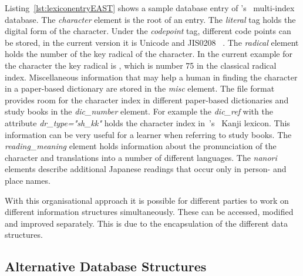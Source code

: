 Listing~\ref{lst:lexiconentryEAST} shows a sample database entry of 
's~\citeyear{Breen2004} 
multi-index database.
The \emph{character} element is the root of an entry. The \emph{literal} tag 
holds the digital form of the character. Under the \emph{codepoint} tag, 
different code points can be stored, in the current version it is Unicode and 
JIS0208 ~. 
The \emph{radical} element holds the number of the key radical of the character.
In the current example for the character  the key radical is ,
which is number 75 in the classical radical index.
Miscellaneous information that may help a human in finding the character in a 
paper-based dictionary are stored in the \emph{misc} element.
The file format provides room for the character index in different paper-based
dictionaries and study books in the \emph{dic\_number} element. For example 
the \emph{dic\_ref} with the attribute \emph{dr\_type="sh\_kk"} holds the
character index in~'s~\citeyear{Hadamitzky1995} 
Kanji lexicon. This information can be very
useful for a learner when referring to study books. The \emph{reading\_meaning}
element holds information about the pronunciation of the character and 
translations into a number of different languages. The \emph{nanori} elements
describe additional Japanese readings that occur only in person- and place names.

With this organisational approach it is possible for different parties to work 
on different information structures simultaneously. These can be accessed,
modified and improved separately. This is due to the encapsulation of the 
different data structures.
\newpage %
\begin{xmlcode}
  id,level,labelSrcRef,labelType,traceRef,from,to},%
                   emphstyle={[2]\color{red}},
                   caption={Sample lexicon entry for lexical data},
                   label=lst:lexiconentryEAST]
                   {chapters/codeSamples/EAST.xml}
\end{xmlcode}

\subsection{Alternative Database Structures}
\label{sec:hwre:alternativedatabasestructures}

